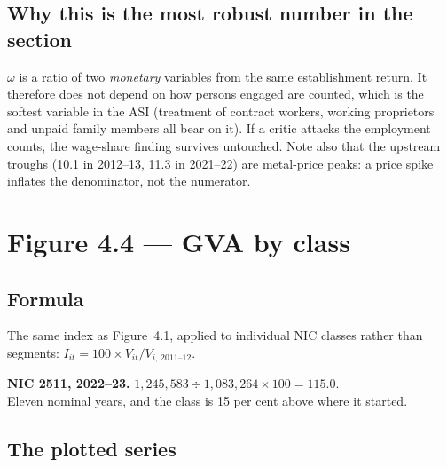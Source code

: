 \documentclass[11pt, a4paper]{article}
\begin{document}
\subsection{Why this is the most robust number in the section}

$\omega$ is a ratio of two \emph{monetary} variables from the same establishment
return. It therefore does not depend on how persons engaged are counted, which is the
softest variable in the ASI (treatment of contract workers, working proprietors and
unpaid family members all bear on it). If a critic attacks the employment counts,
the wage-share finding survives untouched. Note also that the upstream troughs
(10.1 in 2012--13, 11.3 in 2021--22) are metal-price peaks: a price spike inflates the
denominator, not the numerator.

\section{Figure 4.4 --- GVA by class}

\subsection{Formula}

The same index as Figure~4.1, applied to individual NIC classes rather than segments:
$I_{it} = 100 \times V_{it}/V_{i,\,2011\text{--}12}$.

\begin{work}
\textbf{NIC 2511, 2022--23.} $1{,}245{,}583 \div 1{,}083{,}264 \times 100 = 115.0$. \\
Eleven nominal years, and the class is 15 per cent above where it started.
\end{work}

\subsection{The plotted series}

\begin{table}[H]
\centering\footnotesize
{}
\end{table}
\end{document}
